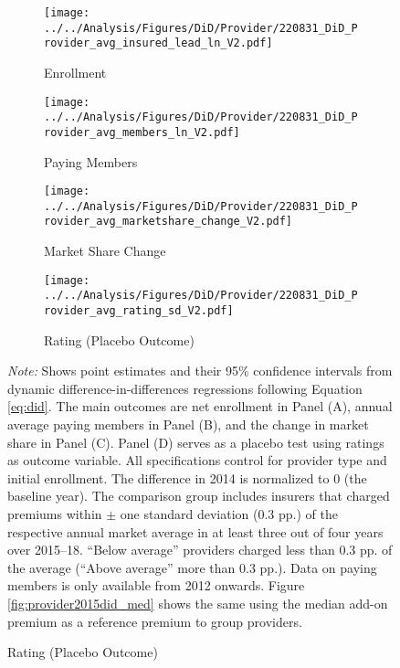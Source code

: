 \documentclass[a4paper, 11pt, english]{article}
\begin{document}
\begin{figure}[htpb]
	\captionsetup{justification=centering}
	\caption{Difference-in-Differences Analyses of Health Insurance Demand on the Insurer-Level \\ (Reference: Average Add-On Premium)}
	\label{fig:provider2015did}
	\begin{subfigure}[b]{0.49\textwidth}
		\caption{Enrollment}
		\label{fig:provider2015did_demand}
		\texttt{[image: ../../Analysis/Figures/DiD/Provider/220831\_DiD\_Provider\_avg\_insured\_lead\_ln\_V2.pdf]}
	\end{subfigure}
	\begin{subfigure}[b]{0.49\textwidth}
		\caption{Paying Members}
		\label{fig:provider2015did_members}
		\texttt{[image: ../../Analysis/Figures/DiD/Provider/220831\_DiD\_Provider\_avg\_members\_ln\_V2.pdf]}
	\end{subfigure}
	\begin{subfigure}[b]{0.49\textwidth}
		\caption{Market Share Change}
		\label{fig:provider2015did_marketsharechange}
		\texttt{[image: ../../Analysis/Figures/DiD/Provider/220831\_DiD\_Provider\_avg\_marketshare\_change\_V2.pdf]}
	\end{subfigure}
	\begin{subfigure}[b]{0.49\textwidth}
		\caption{Rating (Placebo Outcome)}
		\label{fig:provider2015did_rating}
		\texttt{[image: ../../Analysis/Figures/DiD/Provider/220831\_DiD\_Provider\_avg\_rating\_sd\_V2.pdf]}
	\end{subfigure}
	\begin{minipage}{\textwidth}
		\footnotesize \vspace{0.2em}
		\textit{Note:} Shows point estimates and their 95\% confidence intervals from dynamic difference-in-differences regressions following Equation \eqref{eq:did}. 
		The main outcomes are net enrollment in Panel (A), annual average paying members in Panel (B), and the change in market share in Panel (C). Panel (D) serves as a placebo test using ratings as outcome variable.
		All specifications control for provider type and initial enrollment. The difference in 2014 is normalized to 0 (the baseline year).
		The comparison group includes insurers that charged premiums within  $\pm$ one standard deviation (0.3 pp.) of the respective annual market average in at least three out of four years over 2015--18. ``Below average'' providers charged less than 0.3 pp. of the average (``Above average'' more than 0.3 pp.). 
		Data on paying members is only available from 2012 onwards.
		Figure \ref{fig:provider2015did_med} shows the same using the median add-on premium as a reference premium to group providers.
	\end{minipage}
\end{figure}
\end{document}
